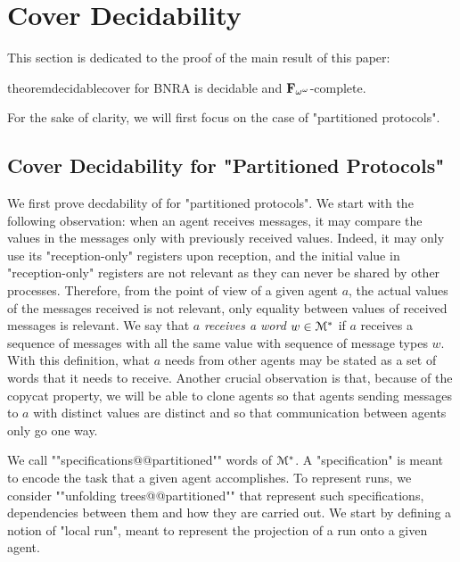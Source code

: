 \section{Cover Decidability}
\label{sec:cover-decidability}

This section is dedicated to the proof of the main result of this paper:

\begin{restatable}{theorem}{decidablecover}
\label{thm:decidable-cover}
\COVER for BNRA is decidable and $\mathbf{F}_{\omega^\omega}$-complete.
\end{restatable}

For the sake of clarity, we will first focus on the case of "partitioned protocols". 

\subsection{Cover Decidability for "Partitioned Protocols"}
We first prove decdability of \COVER for "partitioned protocols". We start with the following observation: when an agent receives messages, it may  compare the values in the messages only with previously received values. Indeed, it may only use its "reception-only" registers upon reception, and the initial value in "reception-only" registers are not relevant as they can never be shared by other processes. Therefore, from the point of view of a given agent $a$, the actual values of the messages received is not relevant, only equality between values of received messages is relevant. We say that $a$ \emph{receives a word $w \in \mathcal{M}^*$} if $a$ receives a sequence of messages with all the same value with sequence of message types $w$. With this definition, what $a$ needs from other agents may be stated as a set of words that it needs to receive. 
Another crucial observation is that, because of the copycat property,  we will be able to clone agents so that agents sending messages to $a$ with distinct values are distinct and so that communication between agents only go one way.

We call ""specifications@@partitioned"" words of $\mathcal{M}^*$. A "specification" is meant to encode the task that a given agent accomplishes. To represent runs, we consider ""unfolding trees@@partitioned"" that represent such specifications, dependencies between them and how they are carried out. 
We start by defining a notion of "local run", meant to represent the projection of a run onto a given agent.

